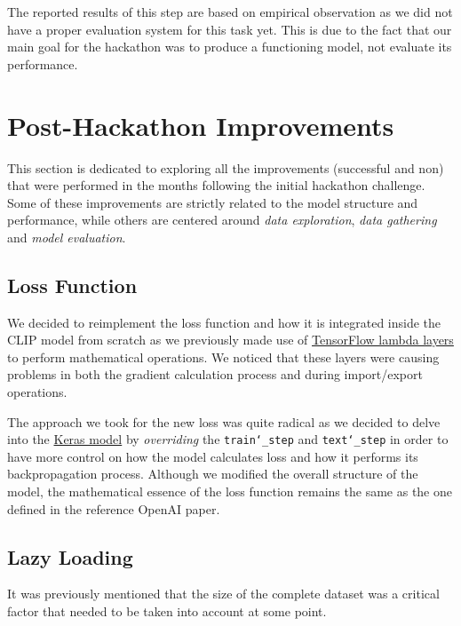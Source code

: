 \documentclass[12pt, a4paper]{article}
\begin{document}
\begin{spacing}{1.25}
    \tiny
    The reported results of this step are based on empirical observation as we did not have a proper evaluation system for this task yet.
    This is due to the fact that our main goal for the hackathon was to produce a functioning model, not evaluate its performance.
\end{spacing}

\section{Post-Hackathon Improvements}
This section is dedicated to exploring all the improvements (successful and non) that were performed in the months following the initial hackathon challenge.
Some of these improvements are strictly related to the model structure and performance, while others are centered around \textit{data exploration}, \textit{data gathering} and \textit{model evaluation}.

\subsection{Loss Function}
We decided to reimplement the loss function and how it is integrated inside the CLIP model from scratch as we previously made use of \href{https://www.tensorflow.org/api_docs/python/tf/keras/layers/Lambda}{TensorFlow lambda layers} to perform mathematical operations.
We noticed that these layers were causing problems in both the gradient calculation process and during import/export operations.

The approach we took for the new loss was quite radical as we decided to delve into the \href{https://www.tensorflow.org/api_docs/python/tf/keras/Model}{Keras model} by \textit{overriding} the \texttt{train\char`_step} and \texttt{text\char`_step} in order to have more control on how the model calculates loss and how it performs its backpropagation process.
Although we modified the overall structure of the model, the mathematical essence of the loss function remains the same as the one defined in the reference OpenAI paper.

\subsection{Lazy Loading}
It was previously mentioned that the size of the complete dataset was a critical factor that needed to be taken into account at some point.
\end{document}

